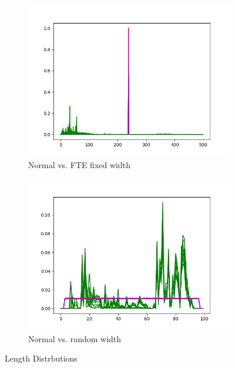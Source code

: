 \documentclass[ %
                    author={Samuel Russell},
                supervisor={Prof. Bogdan Warinschi},
                    degree={MEng},
                     title={Innocuous Ciphertexts},
                  subtitle={The DE-CENSOR Scheme},
                      type={research},
                      year={2018} ]{dissertation}
\begin{document}
\begin{figure}[h]
\begin{subfigure}[b]{.49\linewidth}
\includegraphics[width=\linewidth]{fake_length_dist}
\caption{Normal vs. FTE fixed width}
\label{fig:fake_length_dist}
\end{subfigure}
\begin{subfigure}[b]{.49\linewidth}
\includegraphics[width=\linewidth]{uniform_length_dist}
\caption{Normal vs. random width}
\label{fig:uniform_length_dist}
\end{subfigure}
\caption{Length Distrbutions}
\label{fig:length_dists}
\end{figure}
\end{document}
